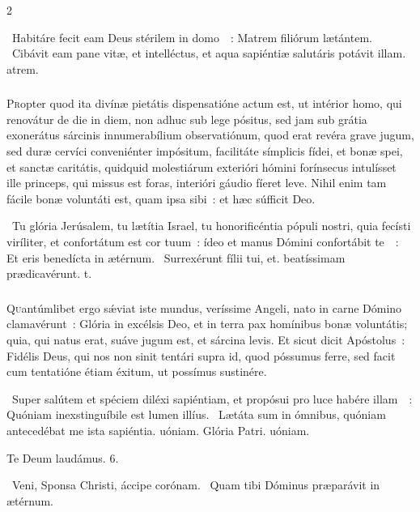 \documentclass[9pt,twoside]{extarticle}
\begin{document}
\begin{multicols}{2}
{{\begin{tightlist}{}
\item {}~Habitáre fecit eam Deus stérilem in domo~~: \textred{*} Matrem filiórum lætántem. ~Cibávit eam pane vitæ, et intelléctus, et aqua sapiéntiæ salutáris potávit illam. atrem.
\end{tightlist}

\subsubsection*{\center {}}
\lettrine{P}ropter quod ita divínæ pietátis dispensatióne actum est, ut intérior homo, qui renovátur de die in diem, non adhuc sub lege pósitus, sed jam sub grátia exonerátus sárcinis innumerabílium observatiónum, quod erat revéra grave jugum, sed duræ cervíci conveniénter impósitum, facilitáte símplicis fídei, et bonæ spei, et sanctæ caritátis, quidquid molestiárum exterióri hómini forínsecus intulísset ille princeps, qui missus est foras, interióri gáudio fíeret leve. Nihil enim tam fácile bonæ voluntáti est, quam ipsa sibi~: et hæc súfficit Deo.

\begin{tightlist}{}
\item {}~Tu glória Jerúsalem, tu lætítia Israel, tu honorificéntia pópuli nostri, quia fecísti viríliter, et confortátum est cor tuum~: ídeo et manus Dómini confortábit te~~: \textred{*} Et eris benedícta in ætérnum. ~Surrexérunt fílii tui, et. beatíssimam prædicavérunt. t.
\end{tightlist}

\subsubsection*{\center {}}
\lettrine{Q}uantúmlibet ergo sǽviat iste mundus, veríssime Angeli, nato in carne Dómino clamavérunt~: Glória in excélsis Deo, et in terra pax homínibus bonæ voluntátis; quia, qui natus erat, suáve jugum est, et sárcina levis. Et sicut dicit Apóstolus~: Fidélis Deus, qui nos non sinit tentári supra id, quod póssumus ferre, sed facit cum tentatióne étiam éxitum, ut possímus sustinére.

\begin{tightlist}{}
\item {}~Super salútem et spéciem diléxi sapiéntiam, et propósui pro luce habére illam~~: \textred{*} Quóniam inexstinguíbile est lumen illíus. ~Lætáta sum in ómnibus, quóniam antecedébat me ista sapiéntia. uóniam. Glória Patri. uóniam.
\item Te Deum laudámus. 6.
\item {}~Veni, Sponsa Christi, áccipe corónam. ~Quam tibi Dóminus præparávit in ætérnum.
\end{tightlist}

}}
\end{multicols}
\end{document}

